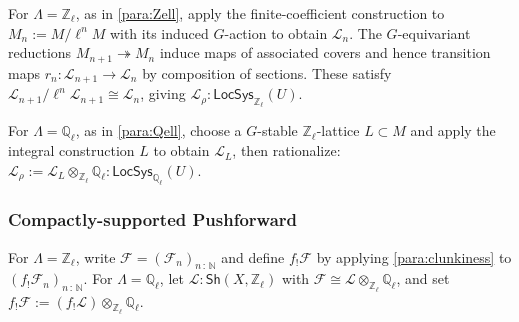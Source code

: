 \documentclass[11pt,letterpaper]{article}
\theoremstyle{numberfirstplain}
\numberwithin{equation}{theorem}
\theoremstyle{numberfirstupright}
\begin{document}
For $\Lambda=\mathbb Z_\ell$, as in \cref{para:Zell}, apply the finite-coefficient construction to $M_n:=M/\ell^nM$ with its induced $G$-action to obtain $\mathcal L_n$. The $G$-equivariant reductions $M_{n+1}\twoheadrightarrow M_n$ induce maps of associated covers and hence transition maps $r_n:\mathcal L_{n+1}\rightarrow\mathcal L_n$ by composition of sections. These satisfy $\mathcal L_{n+1}/\ell^n\mathcal L_{n+1}\cong\mathcal L_n$, giving $\mathcal L_\rho:\mathsf{LocSys}_{\mathbb Z_\ell}(U).$

For $\Lambda=\mathbb Q_\ell$, as in \cref{para:Qell}, choose a $G$-stable $\mathbb Z_\ell$-lattice $L\subset M$ and apply the integral construction $L$ to obtain $\mathcal L_L$, then rationalize:
  $\mathcal L_\rho:=\mathcal L_L\otimes_{\mathbb Z_\ell}\mathbb Q_\ell:\mathsf{LocSys}_{\mathbb Q_\ell}(U).$

\subsubsection{Compactly-supported Pushforward}\label{app:compact-pushforward-corrections}

For $\Lambda=\mathbb Z_\ell$, write $\mathcal F=(\mathcal F_n)_{n\,:\,\mathbb N}$ and define $f_!\mathcal F$ by applying \cref{para:clunkiness} to $(f_!\mathcal F_n)_{n\,:\,\mathbb N}$. 
For $\Lambda=\mathbb Q_\ell$, let $\mathcal L:\mathsf{Sh}(X,\mathbb Z_\ell)$ with $\mathcal F\cong\mathcal L\otimes_{\mathbb Z_\ell}\mathbb Q_\ell$, and set $f_!\mathcal F:=(f_!\mathcal L)\otimes_{\mathbb Z_\ell}\mathbb Q_\ell$. 

%
\end{document}
